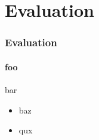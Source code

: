 \section{Evaluation}
\begin{frame}
  \frametitle{Evaluation}
  \framesubtitle{foo}
  bar
        \begin{itemize}
            \item baz
                \pause
              \item qux
        \end{itemize}
\end{frame}

